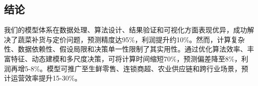 \documentclass{cumcmthesis} %
\begin{document}
\subsection{结论}

我们的模型体系在数据处理、算法设计、结果验证和可视化方面表现优异，成功解决了蔬菜补货与定价问题，预测精度达95\%，利润提升约10\%。然而，计算复杂性、数据依赖性、假设局限和决策单一性限制了其实用性。通过优化算法效率、丰富特征、动态建模和多尺度决策，可将计算时间缩短70\%，预测偏差降至8\%，利润再增5-8\%。模型可推广至生鲜零售、连锁商超、农业供应链和跨行业场景，预计运营效率提升15-30\%。





\newpage 

\begin{center}
\end{center}
\end{document}
